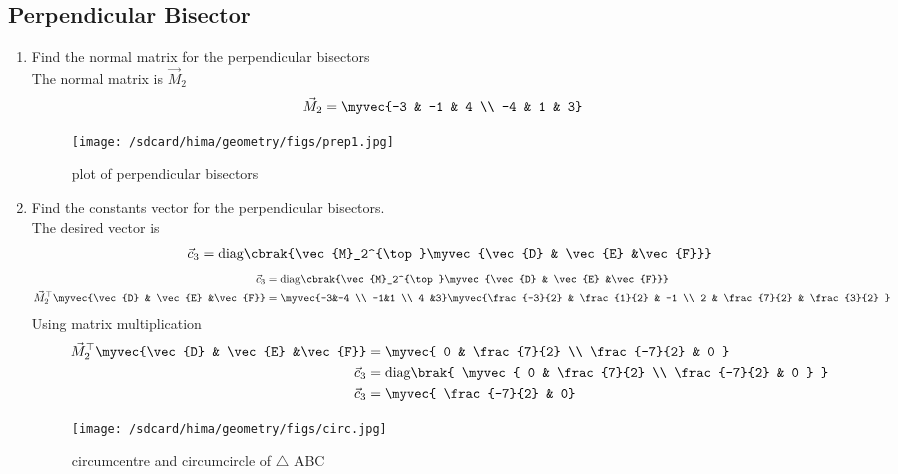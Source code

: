 \documentclass[11pt]{book}
\begin{document}
\subsection{Perpendicular Bisector}

  
\begin{enumerate}[label=\thesubsection.\arabic*.,ref=\thesubsection.\theenumi]
\item Find the normal matrix for the perpendicular bisectors \\
\solution The normal matrix is $\vec{M}_2$
\begin{align}
       \vec{M}_2 &=\myvec{-3 & -1 & 4 \\ -4 & 1 & 3}
\end{align}
\begin{figure}[H]
    \centering
    \texttt{[image: /sdcard/hima/geometry/figs/prep1.jpg]}
    \caption{plot of perpendicular bisectors}
    \label{fig:mat_perp1}
\end{figure}
\item Find the constants vector for the perpendicular bisectors. \\
\solution The desired vector is 
\begin{align}
\vec{c}_3 = \text{diag}\cbrak{\vec{M}_2^{\top}\myvec{\vec{D} & \vec{E} &\vec{F}}}
\end{align}
\solution
\begin{align}
\vec{c}_3 &= \text{diag}\cbrak{\vec{M}_2^{\top}\myvec{\vec{D} & \vec{E} &\vec{F}}} \\
\vec{M}_2^{\top}\myvec{\vec{D} & \vec{E} &\vec{F}} &= \myvec{-3&-4 \\ -1&1 \\ 4 &3}\myvec{\frac{-3}{2} & \frac{1}{2} & -1 \\ 2 & \frac{7}{2}  & \frac{3}{2} } \\
\end{align}
Using matrix multiplication
\begin{align}
 \vec{M}_2^{\top}\myvec{\vec{D} & \vec{E} &\vec{F}} &=\myvec{ 0 & \frac{7}{2} \\ \frac{-7}{2} & 0 } \\
    \vec{c}_3 &= \text{diag}\brak{ \myvec{ 0 & \frac{7}{2} \\ \frac{-7}{2} & 0  } } \\
 \vec{c}_3   &= \myvec{ \frac{-7}{2} &  0}
\end{align}
\begin{figure}[H]
    \centering
    \texttt{[image: /sdcard/hima/geometry/figs/circ.jpg]}
    \caption{circumcentre and circumcircle of $\triangle$ ABC}
    \label{fig:mat_perp2}
\end{figure}
\end{enumerate}
\end{document}
